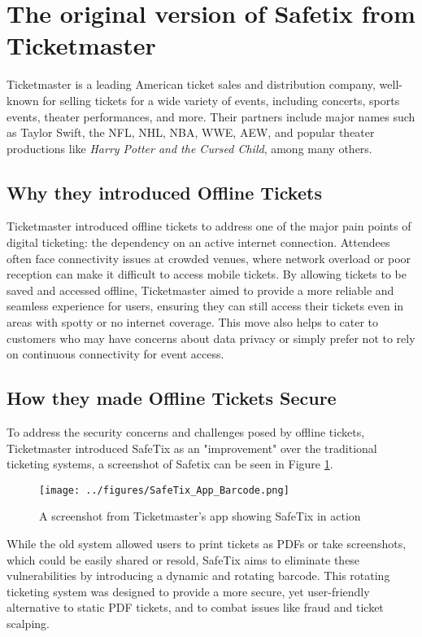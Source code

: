 \section{The original version of Safetix from Ticketmaster}
Ticketmaster is a leading American ticket sales and distribution company, well-known for selling tickets for a wide variety of events, 
including concerts, sports events, theater performances, and more. Their partners include major names such as Taylor Swift, 
the NFL, NHL, NBA, WWE, AEW, and popular theater productions like \textit{Harry Potter and the Cursed Child}, among many others. 

\subsection{Why they introduced Offline Tickets}
Ticketmaster introduced offline tickets to address one of the major pain points of digital ticketing: the dependency on an active internet connection. 
Attendees often face connectivity issues at crowded venues, where network overload or poor reception can make it difficult to access mobile tickets. 
By allowing tickets to be saved and accessed offline, Ticketmaster aimed to provide a more reliable and seamless experience for users, 
ensuring they can still access their tickets even in areas with spotty or no internet coverage. 
This move also helps to cater to customers who may have concerns about data privacy or simply prefer not to rely on continuous connectivity for event access.

\subsection{How they made Offline Tickets Secure}
To address the security concerns and challenges posed by offline tickets, Ticketmaster introduced SafeTix as an "improvement" over the traditional ticketing systems, a screenshot of Safetix can be seen in Figure
\ref{fig:app_barcode}.
\begin{figure}[H]
    \begin{center}        
    \texttt{[image: ../figures/SafeTix\_App\_Barcode.png]}
    \caption{A screenshot from Ticketmaster's app showing SafeTix in action \cite{ticketmaster_mobile_ticketing}}
    \label{fig:app_barcode}
    \end{center}
\end{figure}
While the old system allowed users to print tickets as PDFs or take screenshots, which could be easily shared or resold, SafeTix aims to eliminate these vulnerabilities by introducing a dynamic and rotating barcode. 
This rotating ticketing system was designed to provide a more secure, yet user-friendly alternative to static PDF tickets, and to combat issues like fraud and ticket scalping.

